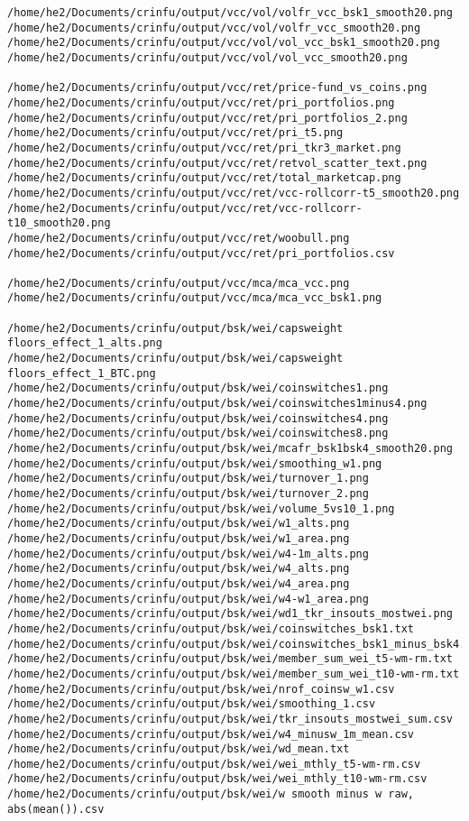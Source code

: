 \documentclass[12,]{article}
\begin{document}
\begin{verbatim}
/home/he2/Documents/crinfu/output/vcc/vol/volfr_vcc_bsk1_smooth20.png
/home/he2/Documents/crinfu/output/vcc/vol/volfr_vcc_smooth20.png
/home/he2/Documents/crinfu/output/vcc/vol/vol_vcc_bsk1_smooth20.png
/home/he2/Documents/crinfu/output/vcc/vol/vol_vcc_smooth20.png

/home/he2/Documents/crinfu/output/vcc/ret/price-fund_vs_coins.png
/home/he2/Documents/crinfu/output/vcc/ret/pri_portfolios.png
/home/he2/Documents/crinfu/output/vcc/ret/pri_portfolios_2.png
/home/he2/Documents/crinfu/output/vcc/ret/pri_t5.png
/home/he2/Documents/crinfu/output/vcc/ret/pri_tkr3_market.png
/home/he2/Documents/crinfu/output/vcc/ret/retvol_scatter_text.png
/home/he2/Documents/crinfu/output/vcc/ret/total_marketcap.png
/home/he2/Documents/crinfu/output/vcc/ret/vcc-rollcorr-t5_smooth20.png
/home/he2/Documents/crinfu/output/vcc/ret/vcc-rollcorr-t10_smooth20.png
/home/he2/Documents/crinfu/output/vcc/ret/woobull.png
/home/he2/Documents/crinfu/output/vcc/ret/pri_portfolios.csv

/home/he2/Documents/crinfu/output/vcc/mca/mca_vcc.png
/home/he2/Documents/crinfu/output/vcc/mca/mca_vcc_bsk1.png

/home/he2/Documents/crinfu/output/bsk/wei/capsweight floors_effect_1_alts.png
/home/he2/Documents/crinfu/output/bsk/wei/capsweight floors_effect_1_BTC.png
/home/he2/Documents/crinfu/output/bsk/wei/coinswitches1.png
/home/he2/Documents/crinfu/output/bsk/wei/coinswitches1minus4.png
/home/he2/Documents/crinfu/output/bsk/wei/coinswitches4.png
/home/he2/Documents/crinfu/output/bsk/wei/coinswitches8.png
/home/he2/Documents/crinfu/output/bsk/wei/mcafr_bsk1bsk4_smooth20.png
/home/he2/Documents/crinfu/output/bsk/wei/smoothing_w1.png
/home/he2/Documents/crinfu/output/bsk/wei/turnover_1.png
/home/he2/Documents/crinfu/output/bsk/wei/turnover_2.png
/home/he2/Documents/crinfu/output/bsk/wei/volume_5vs10_1.png
/home/he2/Documents/crinfu/output/bsk/wei/w1_alts.png
/home/he2/Documents/crinfu/output/bsk/wei/w1_area.png
/home/he2/Documents/crinfu/output/bsk/wei/w4-1m_alts.png
/home/he2/Documents/crinfu/output/bsk/wei/w4_alts.png
/home/he2/Documents/crinfu/output/bsk/wei/w4_area.png
/home/he2/Documents/crinfu/output/bsk/wei/w4-w1_area.png
/home/he2/Documents/crinfu/output/bsk/wei/wd1_tkr_insouts_mostwei.png
/home/he2/Documents/crinfu/output/bsk/wei/coinswitches_bsk1.txt
/home/he2/Documents/crinfu/output/bsk/wei/coinswitches_bsk1_minus_bsk4.txt
/home/he2/Documents/crinfu/output/bsk/wei/member_sum_wei_t5-wm-rm.txt
/home/he2/Documents/crinfu/output/bsk/wei/member_sum_wei_t10-wm-rm.txt
/home/he2/Documents/crinfu/output/bsk/wei/nrof_coinsw_w1.csv
/home/he2/Documents/crinfu/output/bsk/wei/smoothing_1.csv
/home/he2/Documents/crinfu/output/bsk/wei/tkr_insouts_mostwei_sum.csv
/home/he2/Documents/crinfu/output/bsk/wei/w4_minusw_1m_mean.csv
/home/he2/Documents/crinfu/output/bsk/wei/wd_mean.txt
/home/he2/Documents/crinfu/output/bsk/wei/wei_mthly_t5-wm-rm.csv
/home/he2/Documents/crinfu/output/bsk/wei/wei_mthly_t10-wm-rm.csv
/home/he2/Documents/crinfu/output/bsk/wei/w smooth minus w raw, abs(mean()).csv


\end{verbatim}
\end{document}
